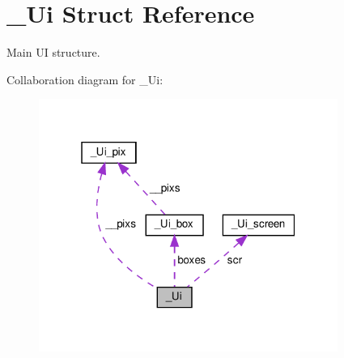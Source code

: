 \hypertarget{struct__Ui}{}\section{\+\_\+\+Ui Struct Reference}
\label{struct__Ui}


Main UI structure.  




Collaboration diagram for \+\_\+\+Ui\+:\nopagebreak
\begin{figure}[H]
\begin{center}
\leavevmode
\includegraphics[width=277pt]{struct__Ui__coll__graph}
\end{center}
\end{figure}
